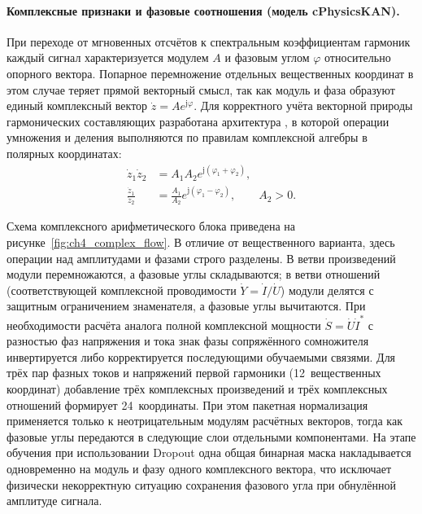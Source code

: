 \paragraph{Комплексные признаки и фазовые соотношения (модель cPhysicsKAN).}
При переходе от мгновенных отсчётов к спектральным коэффициентам гармоник
каждый сигнал характеризуется модулем $A$ и фазовым углом $\varphi$
относительно опорного вектора. Попарное перемножение отдельных
вещественных координат в этом случае теряет прямой векторный смысл, так
как модуль и фаза образуют единый комплексный вектор
$\dot{z} = A e^{\mathrm{j}\varphi}$. Для корректного учёта векторной
природы гармонических составляющих разработана архитектура
, в которой операции умножения и деления выполняются по
правилам комплексной алгебры в полярных координатах:
\begin{equation}
\begin{aligned}
    \dot{z}_1\dot{z}_2 &= A_1A_2e^{\mathrm{j}(\varphi_1+\varphi_2)},\\
    \frac{\dot{z}_1}{\dot{z}_2} &= \frac{A_1}{A_2}
        e^{\mathrm{j}(\varphi_1-\varphi_2)}, \qquad A_2>0.
\end{aligned}
\label{eq:ch4_complex_operations}
\end{equation}

Схема комплексного арифметического блока приведена на
рисунке~\ref{fig:ch4_complex_flow}. В отличие от вещественного варианта,
здесь операции над амплитудами и фазами строго разделены. В ветви
произведений модули перемножаются, а фазовые углы складываются; в ветви
отношений (соответствующей комплексной проводимости $\dot{Y}=\dot{I}/\dot{U}$)
модули делятся с защитным ограничением знаменателя, а фазовые углы
вычитаются. При необходимости расчёта аналога полной комплексной мощности
$\dot{S}=\dot{U}\dot{I}^*$ с разностью фаз напряжения и тока знак фазы
сопряжённого сомножителя инвертируется либо корректируется последующими
обучаемыми связями. Для трёх пар фазных токов и напряжений первой
гармоники (12~вещественных координат) добавление трёх комплексных
произведений и трёх комплексных отношений формирует 24~координаты. При
этом пакетная нормализация применяется только к неотрицательным модулям
расчётных векторов, тогда как фазовые углы передаются в следующие слои
отдельными компонентами. На этапе обучения при использовании Dropout одна
общая бинарная маска накладывается одновременно на модуль и фазу одного
комплексного вектора, что исключает физически некорректную ситуацию
сохранения фазового угла при обнулённой амплитуде сигнала.

